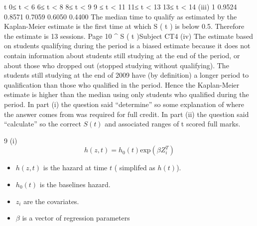 \documentclass[a4paper,12pt]{article}
\begin{document}
t
0≤ t < 6
6≤ t < 8
8≤ t < 9
9 ≤ t < 11
11≤ t < 13
13≤ t < 14
(iii)
1
0.9524
0.8571
0.7059
0.6050
0.4400
The median time to qualify as estimated by the Kaplan-Meier estimate
is the first time at which S ( t ) is below 0.5.
Therefore the estimate is 13 sessions.
Page 10
^
S ( t )Subject CT4 %
(iv)
The estimate based on students qualifying during the period is a biased estimate because it does not contain information
about students still studying at the end of the period, or about those who dropped out (stopped studying without qualifying).
The students still studying at the end of 2009 have (by definition) a longer period to qualification than those who qualified in the period.
Hence the Kaplan-Meier estimate is higher than the median using only students who qualified during the period.
In part (i) the question said “determine” so some explanation of where the answer comes from was required for full credit. In part (ii) the question said “calculate” so the correct $S(t)$ and associated ranges of t scored full marks.
\newpage

9
(i)
\[ h(z,t) = h_0(t) \mbox{exp}(\beta Z_i^{T})\]

\begin{itemize}
\item $h(z,t)$ is the hazard at time $t$ ( simplifed as $h(t)$).
\item $h_0(t)$ is the baselines hazard.
\item $z_i$ are the covariates.
\item $\beta$ is a vector of regression parameters
\end{itemize}
\end{document}
